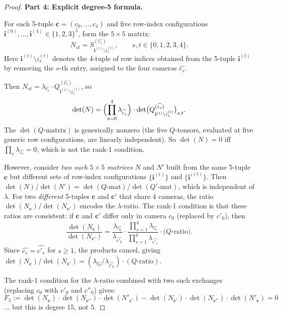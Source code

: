 \begin{proof}
\medskip
\textbf{Part 4: Explicit degree-5 formula.}

For each 5-tuple $\mathbf{c} = (c_0,\ldots,c_4)$ and five row-index configurations
$\mathbf{i}^{(0)},\ldots,\mathbf{i}^{(4)}\in\{1,2,3\}^5$, form the $5\times 5$ matrix:
\begin{equation}\label{eq:p9-Nmatrix}
  N_{st} = S^{(\widehat{c_s})}_{\mathbf{i}^{(t)}\setminus i^{(t)}_s},
  \qquad s,t\in\{0,1,2,3,4\}.
\end{equation}
Here $\mathbf{i}^{(t)}\setminus i^{(t)}_s$ denotes the 4-tuple of row indices
obtained from the 5-tuple $\mathbf{i}^{(t)}$ by removing the $s$-th entry,
assigned to the four cameras $\widehat{c_s}$.

Then $N_{st} = \lambda_{\widehat{c_s}}\cdot Q^{(\widehat{c_s})}_{\mathbf{i}^{(t)}\setminus i^{(t)}_s}$,
so
\[
  \det(N) = \Bigl(\prod_{s=0}^{4}\lambda_{\widehat{c_s}}\Bigr)\cdot
  \det\bigl(Q^{(\widehat{c_s})}_{\mathbf{i}^{(t)}\setminus i^{(t)}_s}\bigr)_{s,t}.
\]
The $\det(Q\text{-matrix})$ is generically nonzero (the five $Q$-tensors,
evaluated at five generic row configurations, are linearly independent).
So $\det(N) = 0$ iff $\prod_s\lambda_{\widehat{c_s}} = 0$, which is not
the rank-1 condition.

However, consider \emph{two such $5\times 5$ matrices} $N$ and $N'$
built from the same 5-tuple $\mathbf{c}$ but different sets of row-index
configurations $\{\mathbf{i}^{(t)}\}$ and $\{\mathbf{i}'^{(t)}\}$.
Then $\det(N)/\det(N') = \det(Q\text{-mat})/\det(Q'\text{-mat})$, which is
independent of $\lambda$. For two \emph{different} 5-tuples $\mathbf{c}$
and $\mathbf{c}'$ that share 4 cameras, the ratio $\det(N_{\mathbf{c}})/\det(N_{\mathbf{c}'})$
encodes the $\lambda$-ratio. The rank-1 condition is that these ratios
are consistent: if $\mathbf{c}$ and $\mathbf{c}'$ differ only in camera $c_0$
(replaced by $c'_0$), then
\[
  \frac{\det(N_{\mathbf{c}})}{\det(N_{\mathbf{c}'})}
  = \frac{\lambda_{\widehat{c_0}}}{\lambda_{\widehat{c'_0}}} \cdot
  \frac{\prod_{s=1}^{4}\lambda_{\widehat{c_s}}}{\prod_{s=1}^{4}\lambda_{\widehat{c'_s}}}
  \cdot \text{($Q$-ratio)}.
\]
Since $\widehat{c_s} = \widehat{c'_s}$ for $s\geq 1$, the products cancel, giving
$\det(N_\mathbf{c})/\det(N_{\mathbf{c}'}) = (\lambda_{\widehat{c_0}}/\lambda_{\widehat{c'_0}})\cdot(Q\text{-ratio})$.

The rank-1 condition for the $\lambda$-ratio combined with two such
exchanges (replacing $c_0$ with $c'_0$ and $c''_0$) gives:
\begin{equation}\label{eq:p9-F5def}
  F_5 := \det(N_{\mathbf{c}})\cdot\det(N_{\mathbf{c}''})\cdot\det(N'_{\mathbf{c}'})
  - \det(N_{\mathbf{c}'})\cdot\det(N_{\mathbf{c}''})\cdot\det(N'_{\mathbf{c}}) = 0
\end{equation}
... but this is degree $15$, not $5$.


\end{proof}

